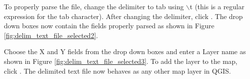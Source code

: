 To properly parse the file, change the delimiter to tab using \mbox{$\backslash$}t (this is a regular expression for the tab character).
After changing the delimiter, click .
The drop down boxes now contain the fields properly parsed as shown in Figure \ref{fig:delim_text_file_selected2}.


Choose the X and Y fields from the drop down boxes and enter a Layer name as shown in Figure \ref{fig:delim_text_file_selected3}.
To add the layer to the map, click .
The delimited text file now behaves as any other map layer in QGIS.
